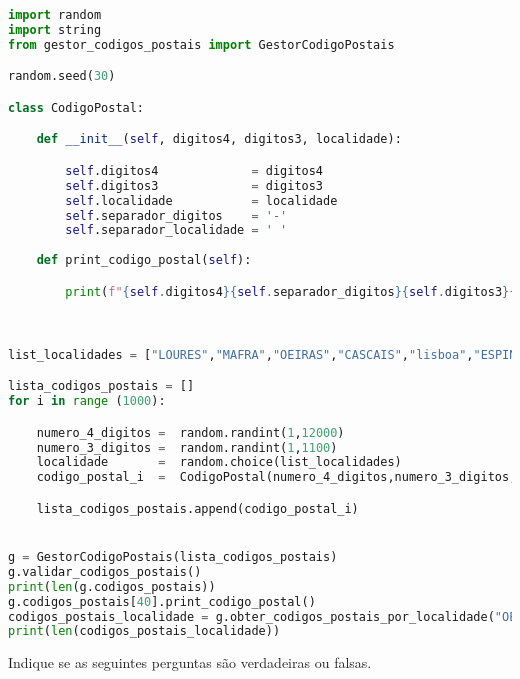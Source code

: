 \documentclass[12pt,varwidth=16cm,border=17pt]{standalone}
\begin{document}
\begin{lstlisting}[language=Python]
import random
import string
from gestor_codigos_postais import GestorCodigoPostais

random.seed(30)

class CodigoPostal:

    def __init__(self, digitos4, digitos3, localidade):

        self.digitos4             = digitos4
        self.digitos3             = digitos3
        self.localidade           = localidade
        self.separador_digitos    = '-'
        self.separador_localidade = ' '
    
    def print_codigo_postal(self):

        print(f"{self.digitos4}{self.separador_digitos}{self.digitos3}{self.separador_localidade}{self.localidade}")

        

list_localidades = ["LOURES","MAFRA","OEIRAS","CASCAIS","lisboa","ESPINHO","MAIA","Amarante","valongo","OVAR","Pombal","Batalha"]

lista_codigos_postais = []
for i in range (1000):

    numero_4_digitos =  random.randint(1,12000)
    numero_3_digitos =  random.randint(1,1100)
    localidade       =  random.choice(list_localidades)
    codigo_postal_i  =  CodigoPostal(numero_4_digitos,numero_3_digitos,localidade)

    lista_codigos_postais.append(codigo_postal_i)


g = GestorCodigoPostais(lista_codigos_postais)
g.validar_codigos_postais()
print(len(g.codigos_postais))
g.codigos_postais[40].print_codigo_postal()
codigos_postais_localidade = g.obter_codigos_postais_por_localidade("OEIRAS_LOCALIDADE")
print(len(codigos_postais_localidade))
\end{lstlisting}

Indique se as seguintes perguntas são verdadeiras ou falsas.
\end{document}
